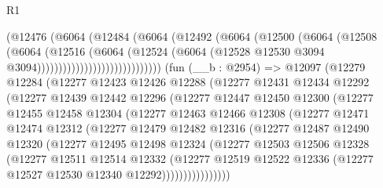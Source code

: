 \begin{lexlean}{R1}
\begin{coremodule}
                                (@12476
                                  (@6064
                                    (@12484
                                      (@6064
                                        (@12492
                                          (@6064
                                            (@12500
                                              (@6064
                                                (@12508
                                                  (@6064
                                                    (@12516
                                                      (@6064
                                                        (@12524
                                                          (@6064
                                                            (@12528
                                                              @12530
                                                              @3094
                                                              @3094)))))))))))))))))))))))))))))
    (fun (__b : @2954) =>
    @12097
      (@12279
        @12284
        (@12277
          @12423
          @12426
          @12288
          (@12277
            @12431
            @12434
            @12292
            (@12277
              @12439
              @12442
              @12296
              (@12277
                @12447
                @12450
                @12300
                (@12277
                  @12455
                  @12458
                  @12304
                  (@12277
                    @12463
                    @12466
                    @12308
                    (@12277
                      @12471
                      @12474
                      @12312
                      (@12277
                        @12479
                        @12482
                        @12316
                        (@12277
                          @12487
                          @12490
                          @12320
                          (@12277
                            @12495
                            @12498
                            @12324
                            (@12277
                              @12503
                              @12506
                              @12328
                              (@12277
                                @12511
                                @12514
                                @12332
                                (@12277
                                  @12519
                                  @12522
                                  @12336
                                  (@12277 @12527 @12530 @12340 @12292))))))))))))))))

\end{coremodule}
\end{lexlean}
